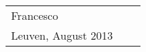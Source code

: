 \vspace{2cm}

\noindent
\begin{tabular}{lcl}
    Francesco &  \\
    Leuven, August 2013
\end{tabular}
\vspace{1cm}


\newpage
